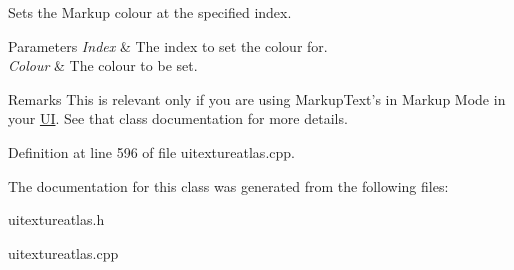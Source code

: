 Sets the Markup colour at the specified index. 


\begin{DoxyParams}{Parameters}
{\em Index} & The index to set the colour for. \\
\hline
{\em Colour} & The colour to be set. \\
\hline
\end{DoxyParams}
\begin{DoxyRemark}{Remarks}
This is relevant only if you are using MarkupText's in Markup Mode in your \hyperlink{namespaceMezzanine_1_1UI}{UI}. See that class documentation for more details. 
\end{DoxyRemark}


Definition at line 596 of file uitextureatlas.cpp.



The documentation for this class was generated from the following files:\begin{DoxyCompactItemize}
\item 
uitextureatlas.h\item 
uitextureatlas.cpp\end{DoxyCompactItemize}

